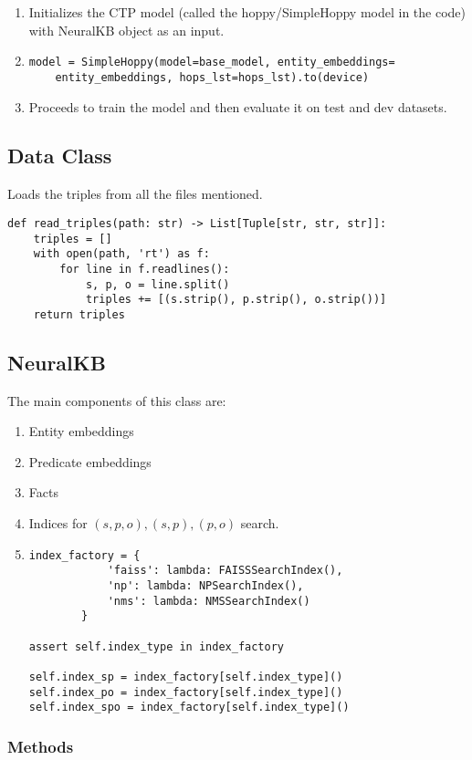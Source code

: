 \documentclass[Other]{iitddiss}
\begin{document}
\begin{enumerate}
\item Initializes the CTP model (called the hoppy/SimpleHoppy model in the code) with NeuralKB object as an input.
\item {\begin{lstlisting}
model = SimpleHoppy(model=base_model, entity_embeddings=
	entity_embeddings, hops_lst=hops_lst).to(device)
\end{lstlisting}}
\item Proceeds to train the model and then evaluate it on test and dev datasets.
\end{enumerate}


\subsection{Data Class}
Loads the triples from all the files mentioned.
\begin{lstlisting}
def read_triples(path: str) -> List[Tuple[str, str, str]]:
    triples = []
    with open(path, 'rt') as f:
        for line in f.readlines():
            s, p, o = line.split()
            triples += [(s.strip(), p.strip(), o.strip())]
    return triples
   \end{lstlisting}


\subsection{NeuralKB}
The main components of this class are:
\begin{enumerate}
\item Entity embeddings
\item Predicate embeddings
\item Facts
\item Indices for \((s, p, o), (s, p), (p, o)\) search.
\item {\begin{lstlisting}
index_factory = {
            'faiss': lambda: FAISSSearchIndex(),
            'np': lambda: NPSearchIndex(),
            'nms': lambda: NMSSearchIndex()
        }

assert self.index_type in index_factory

self.index_sp = index_factory[self.index_type]()
self.index_po = index_factory[self.index_type]()
self.index_spo = index_factory[self.index_type]()
\end{lstlisting}}
\end{enumerate}

\subsubsection{Methods}
\end{document}
